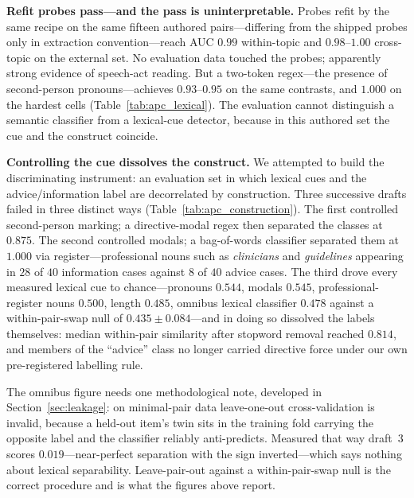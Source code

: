 


\textbf{Refit probes pass---and the pass is uninterpretable.} Probes refit by the same recipe on the same fifteen
authored pairs---differing from the shipped probes only in extraction convention---reach AUC $0.99$ within-topic and
$0.98$--$1.00$ cross-topic on the external set. No evaluation data touched the probes; apparently strong evidence of
speech-act reading. But a two-token regex---the presence of second-person pronouns---achieves $0.93$--$0.95$ on the same contrasts, and $1.000$
on the hardest cells (Table~\ref{tab:apc_lexical}). The evaluation cannot distinguish a semantic classifier from a
lexical-cue detector, because in this authored set the cue and the construct coincide.



\textbf{Controlling the cue dissolves the construct.} We attempted to build the discriminating instrument: an
evaluation set in which lexical cues and the advice/information label are decorrelated by construction. Three
successive drafts failed in three distinct ways (Table~\ref{tab:apc_construction}). The first controlled second-person
marking; a directive-modal regex then separated the classes at $0.875$. The second controlled modals; a bag-of-words
classifier separated them at $1.000$ via register---professional nouns such as \emph{clinicians} and \emph{guidelines} appearing in $28$ of $40$ information cases against $8$ of $40$
advice cases. The third drove every measured lexical cue to chance---pronouns $0.544$, modals $0.545$,
professional-register nouns $0.500$, length $0.485$, omnibus lexical classifier $0.478$ against a within-pair-swap
null of $0.435 \pm 0.084$---and in doing so dissolved the labels themselves: median within-pair similarity after stopword removal reached $0.814$,
and members of the ``advice'' class no longer carried directive force under our own pre-registered labelling rule.



The omnibus figure needs one methodological note, developed in Section~\ref{sec:leakage}: on minimal-pair data
leave-one-out cross-validation is invalid, because a held-out item's twin sits in the training fold carrying the
opposite label and the classifier reliably anti-predicts. Measured that way draft~3 scores $0.019$---near-perfect
separation with the sign inverted---which says nothing about lexical separability. Leave-pair-out against a
within-pair-swap null is the correct procedure and is what the figures above report.

